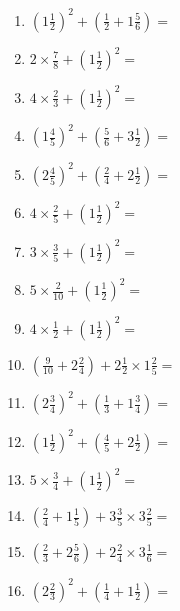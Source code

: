 \documentclass[12pt]{article}
\begin{document}
\begin{enumerate}
\item \large $ (1 \frac{1}{2})^2 + (\frac{1}{2} + 1 \frac{5}{6}) = $ \vspace{1.8cm}
\item \large $ 2 \times \frac{7}{8} + (1 \frac{1}{2})^2 = $ \vspace{1.8cm}
\item \large $ 4 \times \frac{2}{3} + (1 \frac{1}{2})^2 = $ \vspace{1.8cm}
\item \large $ (1 \frac{4}{5})^2 + (\frac{5}{6} + 3 \frac{1}{2}) = $ \vspace{1.8cm}
\item \large $ (2 \frac{4}{5})^2 + (\frac{2}{4} + 2 \frac{1}{2}) = $ \vspace{1.8cm}
\item \large $ 4 \times \frac{2}{5} + (1 \frac{1}{2})^2 = $ \vspace{1.8cm}
\newpage
\item \large $ 3 \times \frac{3}{5} + (1 \frac{1}{2})^2 = $ \vspace{1.8cm}
\item \large $ 5 \times \frac{2}{10} + (1 \frac{1}{2})^2 = $ \vspace{1.8cm}
\item \large $ 4 \times \frac{1}{2} + (1 \frac{1}{2})^2 = $ \vspace{1.8cm}
\item \large $ (\frac{9}{10} + 2 \frac{2}{4}) + 2 \frac{1}{2} \times 1 \frac{2}{5} = $ \vspace{1.8cm}
\item \large $ (2 \frac{3}{4})^2 + (\frac{1}{3} + 1 \frac{3}{4}) = $ \vspace{1.8cm}
\item \large $ (1 \frac{1}{2})^2 + (\frac{4}{5} + 2 \frac{1}{2}) = $ \vspace{1.8cm}
\item \large $ 5 \times \frac{3}{4} + (1 \frac{1}{2})^2 = $ \vspace{1.8cm}
\item \large $ (\frac{2}{4} + 1 \frac{1}{5}) + 3 \frac{3}{5} \times 3 \frac{2}{5} = $ \vspace{1.8cm}
\item \large $ (\frac{2}{3} + 2 \frac{5}{6}) + 2 \frac{2}{4} \times 3 \frac{1}{6} = $ \vspace{1.8cm}
\item \large $ (2 \frac{2}{3})^2 + (\frac{1}{4} + 1 \frac{1}{2}) = $ \vspace{1.8cm}

\end{enumerate}
\end{document}
